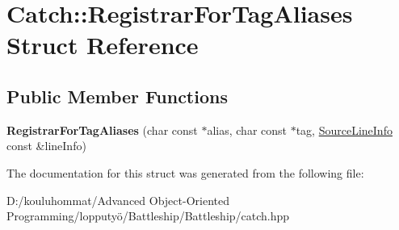 \hypertarget{struct_catch_1_1_registrar_for_tag_aliases}{}\section{Catch\+:\+:Registrar\+For\+Tag\+Aliases Struct Reference}
\label{struct_catch_1_1_registrar_for_tag_aliases}
\subsection*{Public Member Functions}
\begin{DoxyCompactItemize}
\item 
\mbox{\label{struct_catch_1_1_registrar_for_tag_aliases_ae4e45830e4763bcd65d55d8db9167b69}} 
{\bfseries Registrar\+For\+Tag\+Aliases} (char const $\ast$alias, char const $\ast$tag, \mbox{\hyperlink{struct_catch_1_1_source_line_info}{Source\+Line\+Info}} const \&line\+Info)
\end{DoxyCompactItemize}


The documentation for this struct was generated from the following file\+:\begin{DoxyCompactItemize}
\item 
D\+:/kouluhommat/\+Advanced Object-\/\+Oriented Programming/lopputyö/\+Battleship/\+Battleship/catch.\+hpp\end{DoxyCompactItemize}
